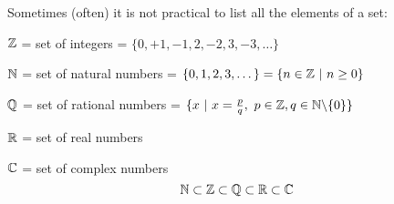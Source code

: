 Sometimes (often) it is not practical to list all the elements of a set: 
\begin{examples}	\shortskip
\item $\mathbb{Z}$ = set of integers = $\{0, +1,-1,2,-2,3,-3,\dots\}$	
\item $\mathbb{N}$ = set of natural numbers = $\{0, 1, 2, 3,\dots\} = \{n \in \mathbb{Z} ~|~ n \geq 0\}$	
\item $\mathbb{Q}$ = set of rational numbers = $\{x ~|~ x = \frac{p}{q},~ p \in \mathbb{Z}, q \in \mathbb{N}\backslash\{0\} \}$	
\item $\mathbb{R}$ = set of real numbers 	
\item $\mathbb{C}$ = set of complex numbers
 \[\mathbb{N} \subset \mathbb{Z} \subset \mathbb{Q} \subset \mathbb{R} \subset \mathbb{C}\]

\end{examples}




